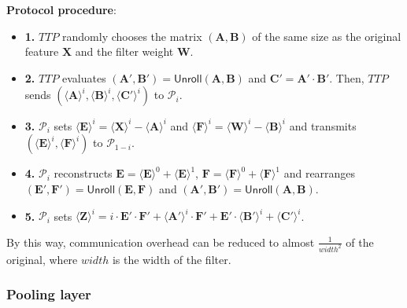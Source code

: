 \documentclass[letterpaper]{article} %
\begin{document}
    \textbf{Protocol procedure}:
    \begin{itemize}
        \item \textbf{1.} $TTP$ randomly chooses the matrix $(\mathbf{A},\mathbf{B})$ of the same size
        as the original feature $\mathbf{X}$ and the filter weight $\mathbf{W}$.
        \item \textbf{2.} $TTP$ evaluates $( \mathbf{A}',\mathbf{B}')=\mathsf{Unroll}(\mathbf{A},\mathbf{B})$
        and $\mathbf{C}' =\mathbf{A}'\cdot \mathbf{B}' $.
        Then, $TTP$ sends $(\langle \mathbf{A}\rangle ^{i},\langle \mathbf{B}\rangle ^{i},\langle \mathbf{C}'\rangle ^{i})$
        to $\mathcal{P}_{i}$.
        \item \textbf{3.} $\mathcal{P}_{i}$ sets $\langle \mathbf{E}\rangle ^{i}=\langle \mathbf{X}\rangle ^{i}-
        \langle \mathbf{A}\rangle ^{i}$
        and $\langle \mathbf{F}\rangle ^{i}=\langle \mathbf{W}\rangle ^{i}-\langle \mathbf{B}\rangle ^{i}$
        and transmits $(\langle \mathbf{E}\rangle ^{i},\langle \mathbf{F}\rangle ^{i})$ to $\mathcal{P}_{1-i}$.
        \item \textbf{4.} $\mathcal{P}_{i}$ reconstructs $\mathbf{E} = \langle \mathbf{E}\rangle ^{0}+\langle \mathbf{E}\rangle ^{1}$,
        $\mathbf{F} = \langle \mathbf{F}\rangle ^{0}+\langle \mathbf{F}\rangle ^{1}$
        and rearranges $(\mathbf{E}',\mathbf{F}')=\mathsf{Unroll}(\mathbf{E},\mathbf{F})$ and $(\mathbf{A}',\mathbf{B}')=\mathsf{Unroll}(\mathbf{A},\mathbf{B})$.
        \item \textbf{5.} $\mathcal{P}_{i}$ sets
        $\langle \mathbf{Z}\rangle^{i}=i\cdot \mathbf{E}' \cdot \mathbf{F}' +
        \langle \mathbf{A}'\rangle^{i} \cdot \mathbf{F}' + \mathbf{E}' \cdot \langle \mathbf{B}'\rangle^{i} + \langle \mathbf{C}'\rangle^{i}$.

    \end{itemize}
    By this way, communication overhead can be reduced to almost $ \frac{1}{width^{2}} $ of the original,
    where $width$ is the width of the filter.


    \subsubsection{Pooling layer}
\end{document}
